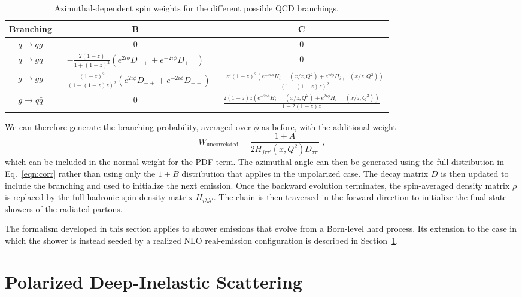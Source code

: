 \documentclass[a4paper,11pt]{article}
\begin{document}
\begin{table}
  \begin{center}
    \begin{tabular}{|c|c|c|}
      \hline
      Branching & B & C \\
      \hline
      $q\to qg$ & 0 & 0 \\
      \hline
      $q\to gq$ & $-\frac{2 (1-z)}{1+(1-z)^2} \left(e^{2 i \phi } D_{-+}+e^{-2 i \phi } D_{+-}\right)$& 0 \\
      \hline
      $g\to gg$ & $-\frac{(1-z)^2}{(1-(1-z) z)^2} \left(e^{2 i \phi } D_{-+}+e^{-2 i \phi } D_{+-}\right)$ & $-\frac{z^2 (1-z)^2 \left(e^{-2 i \phi } H_{i-+}(x/z,Q^2)+e^{2 i \phi }H_{i+-}(x/z,Q^2)\right)}{(1-(1-z) z)^2}$\\
      \hline
      $g\to q\bar{q}$ & 0 &  $\frac{2 (1-z) z \left(e^{-2 i \phi } H_{i-+}(x/z,Q^2)+e^{2 i \phi } H_{i+-}(x/z,Q^2)\right)}{1-2 (1-z) z}$\\
      \hline
  \end{tabular}
    \caption{Azimuthal-dependent spin weights for the different possible QCD branchings.}
    \label{tab:branch2}
  \end{center}
\end{table}

We can therefore generate the branching probability, averaged over $\phi$ as before, with the additional weight
\begin{equation}
  W_\mathrm{uncorrelated} = \frac{1+A}{2H_{j\tau\tau'}(x,Q^2) D_{\tau\tau'}}\;,
\end{equation}
which can be included in the normal weight for the PDF term. The azimuthal angle can then be generated using the full distribution in Eq.~\eqref{eqn:corr} rather than
using only the $1+B$ distribution that applies in the unpolarized case. The decay matrix $D$ is then updated to include the branching and used to initialize the next emission. Once the backward evolution terminates, the spin-averaged density matrix $\rho$ is replaced by the full hadronic spin-density matrix $H_{i\lambda\lambda'}$. The chain is then traversed in the forward direction to initialize the final-state showers of the radiated partons.

The formalism developed in this section applies to shower emissions that evolve from a Born-level hard process. Its extension to the case in which the shower is instead seeded by a realized NLO real-emission configuration is described in Section~\ref{sec:polarizeddis}.

\section{Polarized Deep-Inelastic Scattering}\label{sec:polarizeddis}
\end{document}
